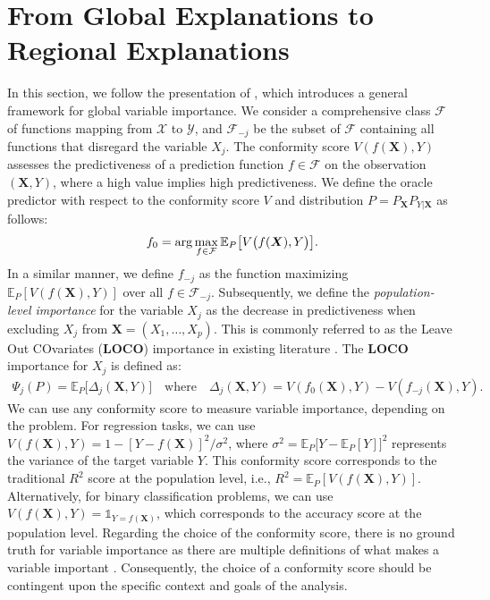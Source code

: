 \documentclass{article}
\newcommand\X{\boldsymbol{X}}
\theoremstyle{plain}
\theoremstyle{definition}
\theoremstyle{remark}
\newcommand{\loco}{\textcolor{loco}{\textbf{LOCO}}}
\begin{document}
\section{From Global Explanations to Regional Explanations}
In this section, we follow the presentation of \cite{williamson2021general}, which introduces a general framework for global variable importance. We consider a comprehensive class $\mathcal{F}$ of functions mapping from $\mathcal{X}$ to $\mathcal{Y}$, and $\mathcal{F}_{-j}$ be the subset of $\mathcal{F}$ containing all functions that disregard the variable $X_j$. The conformity score $V(f(\X), Y)$ assesses the predictiveness of a prediction function $f \in \mathcal{F}$ on the observation $(\X, Y)$, where a high value implies high predictiveness. We define the oracle predictor with respect to the conformity score $V$ and distribution $P=P_{\X}P_{Y|\X}$ as follows:
 \begin{align*}
     \small f_0 = \arg \max_{f \in \mathcal{F}} \mathbb{E}_P\big[V\big(f(\X), Y\big)\big].
 \end{align*}
In a similar manner, we define $f_{-j}$ as the function maximizing $\mathbb{E}_{P}[V\left(f(\X), Y\right)]$ over all $f \in \mathcal{F}_{-j}$. Subsequently, we define the \textit{population-level importance} for the variable $X_j$ as the decrease in predictiveness when excluding $X_j$ from $\X =(X_1, \dots, X_p)$. This is commonly referred to as the Leave Out COvariates (\loco{}) importance in existing literature \citep{Lei2016DistributionFreePI, verdinelli2024feature}. The \loco{} importance for $X_j$ is defined as:
\begin{align*}
    \Psi_{j}(P) = \mathbb{E}_P\big[ \Delta_{j}(\X, Y)\big] \quad \text{where} \quad \Delta_{j}(\X, Y) = V\left(f_0(\X), Y\right) - V\left(f_{-j}(\X), Y\right).
\end{align*}
 We can use any conformity score to measure variable importance, depending on the problem. For regression tasks, we can use $V(f(\X), Y) = 1-[Y - f(\X)]^2/\sigma^2$, where $\sigma^2 = \mathbb{E}_P\big[ Y - \mathbb{E}_P[Y]\big]^2$ represents the variance of the target variable $Y$. This conformity score corresponds to the traditional $R^2$ score at the population level, i.e., $R^2 = \mathbb{E}_{P}[V\left(f(\X), Y\right)]$. Alternatively, for binary classification problems, we can use $V(f(\X), Y) = \mathds{1}_{Y = f(\X)}$, which corresponds to the accuracy score at the population level. Regarding the choice of the conformity score, there is no ground truth for variable importance as there are multiple definitions of what makes a variable important \citep{hooker2019benchmark, hama2022model, verdinelli2024feature}. Consequently, the choice of a conformity score should be contingent upon the specific context and goals of the analysis.
\end{document}
